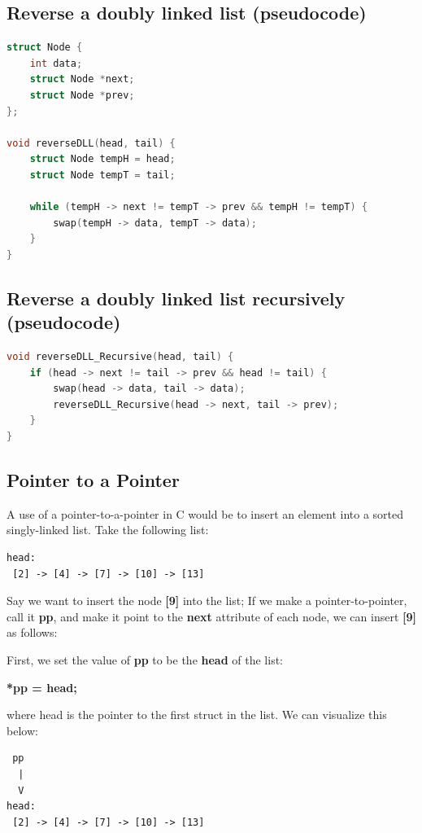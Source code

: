 \documentclass[12pt]{article}
\begin{document}
	\subsection{Reverse a doubly linked list (pseudocode)}
	\begin{lstlisting}[language = C, showstringspaces = false, tabsize = 8]
struct Node {
	int data;
	struct Node *next;
	struct Node *prev;
};

void reverseDLL(head, tail) {
	struct Node tempH = head;
	struct Node tempT = tail;

	while (tempH -> next != tempT -> prev && tempH != tempT) {
		swap(tempH -> data, tempT -> data);
	}
}
	\end{lstlisting}
	\subsection{Reverse a doubly linked list recursively (pseudocode)}
	\begin{lstlisting}[language = C, showstringspaces = false, tabsize = 8]
void reverseDLL_Recursive(head, tail) {
	if (head -> next != tail -> prev && head != tail) {
		swap(head -> data, tail -> data);
		reverseDLL_Recursive(head -> next, tail -> prev);
	}
}
	\end{lstlisting}
	\subsection{Pointer to a Pointer}
	A use of a pointer-to-a-pointer in C would be to insert an element into a sorted singly-linked list. Take the following list:

	\begin{lstlisting}
head:
 [2] -> [4] -> [7] -> [10] -> [13]
	\end{lstlisting}

	Say we want to insert the node \textbf{[9]} into the list; If we make a pointer-to-pointer, call it \textbf{pp}, and make it point to the \textbf{next} attribute of each node, we can insert \textbf{[9]} as follows: \linebreak

	First, we set the value of \textbf{pp} to be the \textbf{head} of the list: \linebreak

	\textbf{*pp = head;} \linebreak

	where head is the pointer to the first struct in the list. We can visualize this below:

	\begin{lstlisting}
 pp
  |
  V
head:
 [2] -> [4] -> [7] -> [10] -> [13]
	\end{lstlisting}
\end{document}
